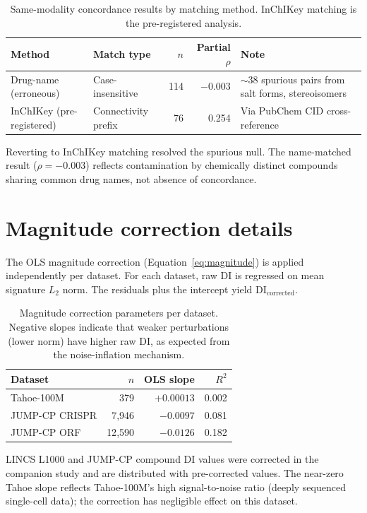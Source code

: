 \documentclass[11pt]{article}
\begin{document}
\vspace{1em}
\begin{table}[h]
\centering
\caption{Same-modality concordance results by matching method.  InChIKey
matching is the pre-registered analysis.}
\label{tab:a1match}
\small
\begin{tabular}{llrrp{4cm}}
\toprule
Method & Match type & $n$ & Partial $\rho$ & Note \\
\midrule
Drug-name (erroneous) & Case-insensitive & 114 & $-0.003$ &
  ${\sim}$38 spurious pairs from salt forms, stereoisomers \\
InChIKey (pre-registered) & Connectivity prefix & 76 & 0.254 &
  Via PubChem CID cross-reference \\
\bottomrule
\end{tabular}
\end{table}

Reverting to InChIKey matching resolved the spurious null.  The
name-matched result ($\rho = -0.003$) reflects contamination by
chemically distinct compounds sharing common drug names, not absence of
concordance.

\section{Magnitude correction details}
\label{app:magnitude}

The OLS magnitude correction (Equation~\ref{eq:magnitude}) is applied
independently per dataset.  For each dataset, raw DI is regressed on
mean signature $L_2$ norm.  The residuals plus the intercept yield
$\mathrm{DI}_{\mathrm{corrected}}$.

\vspace{1em}
\begin{table}[h]
\centering
\caption{Magnitude correction parameters per dataset.  Negative slopes
indicate that weaker perturbations (lower norm) have higher raw DI, as
expected from the noise-inflation mechanism.}
\label{tab:magcorr}
\small
\begin{tabular}{lrrr}
\toprule
Dataset & $n$ & OLS slope & $R^2$ \\
\midrule
Tahoe-100M & 379 & $+0.00013$ & 0.002 \\
JUMP-CP CRISPR & 7{,}946 & $-0.0097$ & 0.081 \\
JUMP-CP ORF & 12{,}590 & $-0.0126$ & 0.182 \\
\bottomrule
\end{tabular}
\end{table}

LINCS L1000 and JUMP-CP compound DI values were corrected in the
companion study \citep{tower2026confound} and are distributed with
pre-corrected values.  The near-zero Tahoe slope reflects Tahoe-100M's
high signal-to-noise ratio (deeply sequenced single-cell data); the
correction has negligible effect on this dataset.
\end{document}
